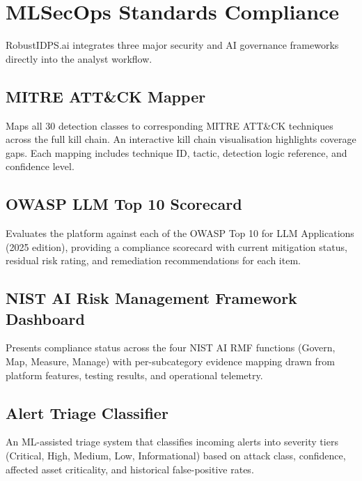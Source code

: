 \section{MLSecOps Standards Compliance}
\label{sec:mlsecops}

RobustIDPS.ai integrates three major security and AI governance frameworks
directly into the analyst workflow.

\subsection{MITRE ATT\&CK Mapper}
Maps all 30 detection classes to corresponding MITRE ATT\&CK techniques
across the full kill chain.  An interactive kill chain visualisation
highlights coverage gaps.  Each mapping includes technique ID, tactic,
detection logic reference, and confidence level.

\subsection{OWASP LLM Top 10 Scorecard}
Evaluates the platform against each of the OWASP Top 10 for LLM Applications
(2025 edition), providing a compliance scorecard with current mitigation
status, residual risk rating, and remediation recommendations for each item.

\subsection{NIST AI Risk Management Framework Dashboard}
Presents compliance status across the four NIST AI RMF functions (Govern,
Map, Measure, Manage) with per-subcategory evidence mapping drawn from
platform features, testing results, and operational telemetry.

\subsection{Alert Triage Classifier}
An ML-assisted triage system that classifies incoming alerts into severity
tiers (Critical, High, Medium, Low, Informational) based on attack class,
confidence, affected asset criticality, and historical false-positive rates.

